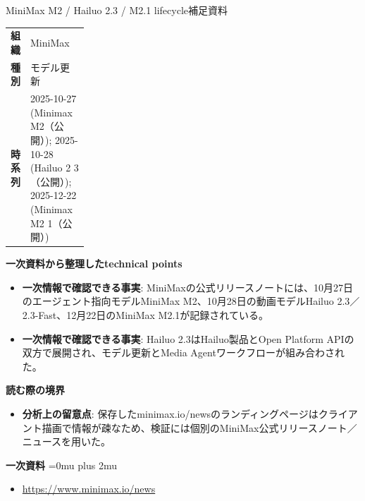 \begin{technicalnote}{MiniMax M2 / Hailuo 2.3 / M2.1 lifecycle}{補足資料}
\begingroup
\begin{tabularx}{\linewidth}{@{}>{\bfseries}p{0.22\linewidth}X@{}}
組織 & MiniMax \\
種別 & モデル更新 \\
時系列 & 2025-10-27 (Minimax M2（公開）); 2025-10-28 (Hailuo 2 3（公開）); 2025-12-22 (Minimax M2 1（公開）) \\
\end{tabularx}
\smallskip
{\bfseries 一次資料から整理したtechnical points}
\begin{itemize}[leftmargin=1.5em,itemsep=0.35em]
\item \textbf{一次情報で確認できる事実}: MiniMaxの公式リリースノートには、10月27日のエージェント指向モデルMiniMax M2、10月28日の動画モデルHailuo 2.3／2.3-Fast、12月22日のMiniMax M2.1が記録されている。
\item \textbf{一次情報で確認できる事実}: Hailuo 2.3はHailuo製品とOpen Platform APIの双方で展開され、モデル更新とMedia Agentワークフローが組み合わされた。
\end{itemize}
\begin{minipage}{\linewidth}
{\bfseries 読む際の境界}
\begin{itemize}[leftmargin=1.5em,itemsep=0.35em]
\item \textbf{分析上の留意点}: 保存したminimax.io/newsのランディングページはクライアント描画で情報が疎なため、検証には個別のMiniMax公式リリースノート／ニュースを用いた。
\end{itemize}
\begin{samepage}
{\bfseries 一次資料}
\begingroup\sloppy
\Urlmuskip=0mu plus 2mu\relax
\begin{itemize}[leftmargin=1.5em,itemsep=0.25em]
\item {\scriptsize\url{https://www.minimax.io/news}}
\end{itemize}
\endgroup
\end{samepage}
\end{minipage}
\endgroup
\end{technicalnote}
\medskip
